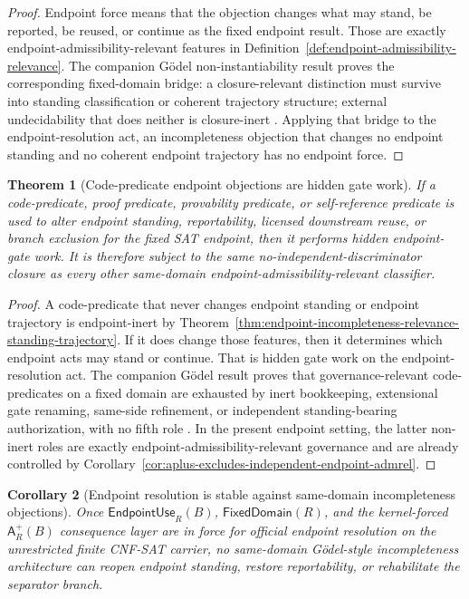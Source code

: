 \documentclass[11pt]{article}
\newtheorem{theorem}{Theorem}[section]
\newtheorem{corollary}[theorem]{Corollary}
\theoremstyle{definition}
\theoremstyle{remark}
\newcommand{\Aplus}{\mathsf{A}^{+}}
\newcommand{\EndpointUse}{\mathsf{EndpointUse}}
\newcommand{\FixedDom}{\mathsf{FixedDomain}}
\begin{document}
\begin{proof}
Endpoint force means that the objection changes what may stand, be reported, be reused, or continue as the fixed endpoint result. Those are exactly endpoint-admissibility-relevant features in Definition~\ref{def:endpoint-admissibility-relevance}. The companion G\"odel non-instantiability result proves the corresponding fixed-domain bridge: a closure-relevant distinction must survive into standing classification or coherent trajectory structure; external undecidability that does neither is closure-inert \cite{GodelNonInstantiability}. Applying that bridge to the endpoint-resolution act, an incompleteness objection that changes no endpoint standing and no coherent endpoint trajectory has no endpoint force.
\end{proof}

\begin{theorem}[Code-predicate endpoint objections are hidden gate work]\label{thm:code-predicate-endpoint-objections-hidden-gate-work}
If a code-predicate, proof predicate, provability predicate, or self-reference predicate is used to alter endpoint standing, reportability, licensed downstream reuse, or branch exclusion for the fixed SAT endpoint, then it performs hidden endpoint-gate work. It is therefore subject to the same no-independent-discriminator closure as every other same-domain endpoint-admissibility-relevant classifier.
\end{theorem}

\begin{proof}
A code-predicate that never changes endpoint standing or endpoint trajectory is endpoint-inert by Theorem~\ref{thm:endpoint-incompleteness-relevance-standing-trajectory}. If it does change those features, then it determines which endpoint acts may stand or continue. That is hidden gate work on the endpoint-resolution act. The companion G\"odel result proves that governance-relevant code-predicates on a fixed domain are exhausted by inert bookkeeping, extensional gate renaming, same-side refinement, or independent standing-bearing authorization, with no fifth role \cite{GodelNonInstantiability}. In the present endpoint setting, the latter non-inert roles are exactly endpoint-admissibility-relevant governance and are already controlled by Corollary~\ref{cor:aplus-excludes-independent-endpoint-admrel}.
\end{proof}

\begin{corollary}[Endpoint resolution is stable against same-domain incompleteness objections]\label{cor:endpoint-resolution-stable-against-incompleteness}
Once \(\EndpointUse_R(B)\), \(\FixedDom(R)\), and the kernel-forced \(\Aplus_R(B)\) consequence layer are in force for official endpoint resolution on the unrestricted finite CNF-SAT carrier, no same-domain G\"odel-style incompleteness architecture can reopen endpoint standing, restore reportability, or rehabilitate the separator branch.
\end{corollary}
\end{document}
